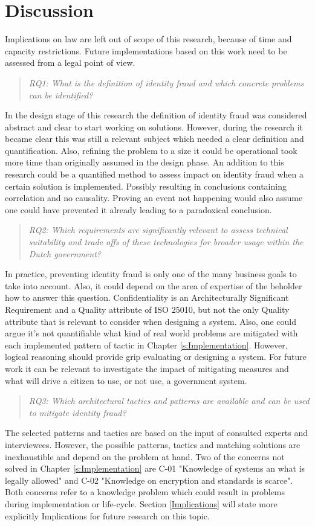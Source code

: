 \chapter{Discussion}\label{s:discussion}
Implications on law are left out of scope of this research, because of time and capacity restrictions. Future implementations based on this work need to be assessed from a legal point of view.

\begin{quote}\emph{RQ1: What is the definition of identity fraud and which concrete problems can be identified?}\end{quote}
In the design stage of this research the definition of identity fraud was considered abstract and clear to start working on solutions. However, during the research it became clear this was still a relevant subject which needed a clear definition and quantification. Also, refining the problem to a size it could be operational took more time than originally assumed in the design phase. An addition to this research could be a quantified method to assess impact on identity fraud when a certain solution is implemented. Possibly resulting in conclusions containing correlation and no causality. Proving an event not happening would also assume one could have prevented it already leading to a paradoxical conclusion.

\begin{quote}\emph{RQ2: Which requirements are significantly relevant to assess technical suitability and trade offs of these technologies for broader usage within the Dutch government?}\end{quote}
In practice, preventing identity fraud is only one of the many business goals to take into account. Also, it could depend on the area of expertise of the beholder how to answer this question. Confidentiality is an Architecturally Significant Requirement and a Quality attribute of ISO 25010, but not the only Quality attribute that is relevant to consider when designing a system. Also, one could argue it's not quantifiable what kind of real world problems are mitigated with each implemented pattern of tactic in Chapter \ref{s:Implementation}. However, logical reasoning should provide grip evaluating or designing a system. For future work it can be relevant to investigate the impact of mitigating measures and what will drive a citizen to use, or not use, a government system.

\begin{quote}\emph{RQ3: Which architectural tactics and patterns are available and can be used to mitigate identity fraud?}\end{quote}
The selected patterns and tactics are based on the input of consulted experts and interviewees. However, the possible patterns, tactics and matching solutions are inexhaustible and depend on the problem at hand. Two of the concerns not solved in Chapter \ref{s:Implementation} are C-01 "Knowledge of systems an what is legally allowed" and C-02 "Knowledge on encryption and standards is scarce". Both concerns refer to a knowledge problem which could result in problems during implementation or life-cycle. Section \ref{Implications} will state more explicitly  Implications for future research on this topic.

